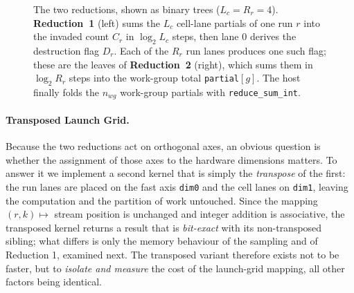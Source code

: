 \begin{figure}[htpb]
    \caption{The two reductions, shown as binary trees ($L_c = R_r = 4$). \textbf{Reduction~1} (left) sums the $L_c$ cell-lane partials of one run $r$ into the invaded count $C_r$ in $\log_2 L_c$ steps, then lane $0$ derives the destruction flag $D_r$. Each of the $R_r$ run lanes produces one such flag; these are the leaves of \textbf{Reduction~2} (right), which sums them in $\log_2 R_r$ steps into the work-group total \texttt{partial}$[g]$. The host finally folds the $n_{wg}$ work-group partials with \texttt{reduce\_sum\_int}.}
    \label{fig:2d_reductions}
\end{figure}

\paragraph{Transposed Launch Grid.}
Because the two reductions act on orthogonal axes, an obvious question is whether the assignment of those axes to the hardware dimensions matters. To answer it we implement a second kernel that is simply the \emph{transpose} of the first: the run lanes are placed on the fast axis \texttt{dim0} and the cell lanes on \texttt{dim1}, leaving the computation and the partition of work untouched. Since the mapping $(r,k) \mapsto$ stream position is unchanged and integer addition is associative, the transposed kernel returns a result that is \emph{bit-exact} with its non-transposed sibling; what differs is only the memory behaviour of the sampling and of Reduction 1, examined next. The transposed variant therefore exists not to be faster, but to \emph{isolate and measure} the cost of the launch-grid mapping, all other factors being identical.

